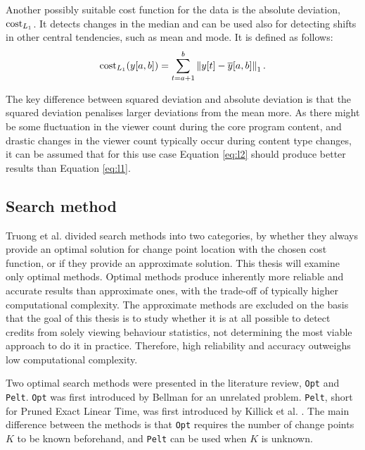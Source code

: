Another possibly suitable cost function for the data is the absolute deviation, $\operatorname{cost}_{L_1}$. It detects changes in the median and can be used also for detecting shifts in other central tendencies, such as mean and mode. It is defined as follows:
\begin{equation}
  \operatorname{cost}_{L_1}(y[a,b]) = \sum^b_{t=a+1} \left\lVert y[t]-\overline{y}[a,b] \right\rVert_1 \text{.}
  \label{eq:l1}
\end{equation}

The key difference between squared deviation and absolute deviation is that the squared deviation penalises larger deviations from the mean more. As there might be some fluctuation in the viewer count during the core program content, and drastic changes in the viewer count typically occur during content type changes, it can be assumed that for this use case Equation \ref{eq:l2} should produce better results than Equation \ref{eq:l1}.

\newpage
\subsection{Search method} \label{subsec:searchmethod}

Truong et al. \cite{truongSelectiveReviewOffline2020} divided search methods into two categories, by whether they always provide an optimal solution for change point location with the chosen cost function, or if they provide an approximate solution. This thesis will examine only optimal methods. Optimal methods produce inherently more reliable and accurate results than approximate ones, with the trade-off of typically higher computational complexity. The approximate methods are excluded on the basis that the goal of this thesis is to study whether it is at all possible to detect credits from solely viewing behaviour statistics, not determining the most viable approach to do it in practice. Therefore, high reliability and accuracy outweighs low computational complexity.

Two optimal search methods were presented in the literature review, \texttt{Opt} and \texttt{Pelt}. \texttt{Opt} was first introduced by Bellman \cite{bellmanRoutingProblem1958} for an unrelated problem. \texttt{Pelt}, short for Pruned Exact Linear Time, was first introduced by Killick et al. \cite{killickOptimalDetectionChangepoints2012}. The main difference between the methods is that \texttt{Opt} requires the number of change points $K$ to be known beforehand, and \texttt{Pelt} can be used when $K$ is unknown.

